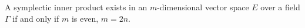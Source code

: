 A symplectic inner product exists in an $m$-dimensional vector space $E$ over a field $\Gamma$ if and only if $m$ is even, $m = 2n$.
